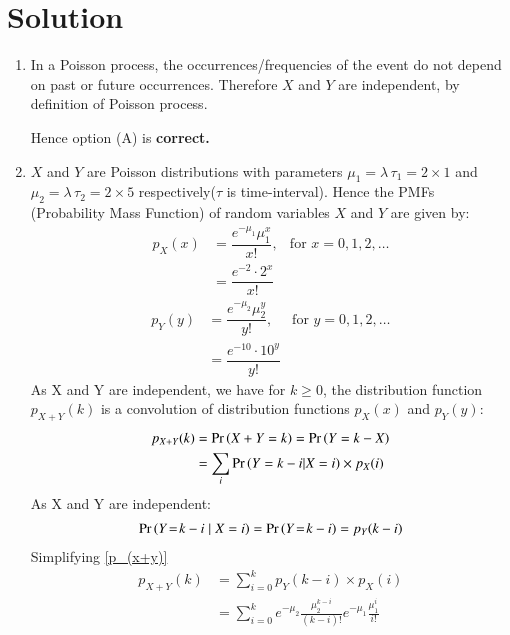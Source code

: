 \documentclass[journal,12pt,twocolumn]{IEEEtran}
\begin{document}
\section{Solution}
\begin{enumerate}[label=\textbf{(\Alph*)}]
    \item In a Poisson process, the occurrences/frequencies of the event do not depend on past or future occurrences. Therefore $X$ and $Y$ are independent, by definition of Poisson process.

    Hence option (A) is \textbf{correct.\\}

    \item $X$ and $Y$ are Poisson distributions with parameters $\mu_1 = \lambda \, \tau_1 = 2 \times 1$ and $\mu_2 = \lambda \, \tau_2 = 2 \times 5$ respectively($\tau$ is time-interval). 
    Hence the PMFs (Probability Mass Function) of random variables $X$ and $Y$ are given by:
    \begin{align}
        p_X(x) &= \dfrac{e^{-\mu_1}\mu_1^{x}}{x!}, & \text{for } x=0,1,2,\dots\\
        &= \dfrac{e^{-2}\cdot 2^{x}}{x!}\label{pmf(X)}
    \end{align}
    \begin{align}
        p_Y(y) &= \dfrac{e^{-\mu_2}\mu_2^{y}}{y!}, & \text{for } y=0,1,2,\dots\\
        &= \dfrac{e^{-10}\cdot 10^{y}}{y!}\label{pmf(Y)}
    \end{align}
    As X and Y are independent, we have for $k \geq 0$, the distribution function $p_{X+Y}(k)$ is a convolution of distribution functions $p_X(x)$ and $p_Y(y)$: 
    \begin{align}
       p_{X+Y}(k) &= \pr{X+ Y = k} = \pr{Y = k - X}\\
       &= \sum_{i}\pr{Y = k - i| X=i}\times p_X(i)\label{p_(x+y)}
    \end{align}
    As X and Y are independent: 
    \begin{align}
        \Pr\left(Y\! =\! k - i \mid X=i\right) = \Pr\left(Y\! = \! k - i\right) = p_Y(k-i)
    \end{align}
    Simplifying \eqref{p_(x+y)}
    \begin{align}
        p_{X+Y}(k) &= \sum_{i=0}^k p_Y(k-i) \times p_X(i)\\
        &= \sum_{i=0}^k e^{-\mu_2}\frac{\mu_2^{k-i}}{(k-i)!}e^{-\mu_1}\frac{\mu_1^i}{i!}\\

\end{align}
\end{enumerate}
\end{document}
